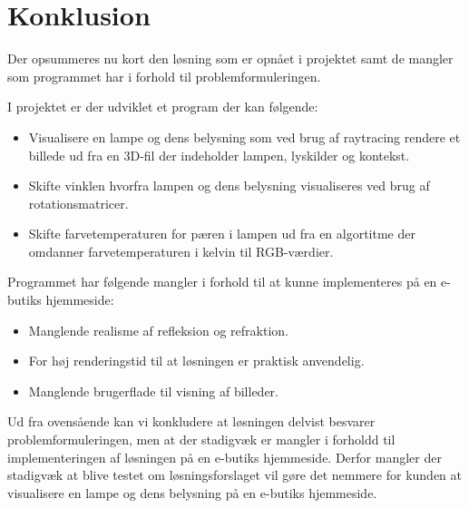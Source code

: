 \section{Konklusion}

Der opsummeres nu kort den løsning som er opnået i projektet samt de mangler som programmet har i forhold til problemformuleringen. 

I projektet er der udviklet et program der kan følgende:
\begin{itemize}
\item Visualisere en lampe og dens belysning som ved brug af raytracing rendere et billede ud fra en 3D-fil der indeholder lampen, lyskilder og kontekst.
\item Skifte vinklen hvorfra lampen og dens belysning visualiseres ved brug af rotationsmatricer. 
\item Skifte farvetemperaturen for pæren i lampen ud fra en algortitme der omdanner farvetemperaturen i kelvin til RGB-værdier. 
\end{itemize}

Programmet har følgende mangler i forhold til at kunne implementeres på en e-butiks hjemmeside:
\begin{itemize}
\item Manglende realisme af refleksion og refraktion.
\item For høj renderingstid til at løsningen er praktisk anvendelig.
\item Manglende brugerflade til visning af billeder.
\end{itemize}

Ud fra ovensående kan vi konkludere at løsningen delvist besvarer problemformuleringen, men at der stadigvæk er mangler i forholdd til implementeringen af løsningen på en e-butiks hjemmeside. Derfor mangler der stadigvæk at blive testet om løsningsforslaget vil gøre det nemmere for kunden at visualisere en lampe og dens belysning på en e-butiks hjemmeside.  

\clearpage